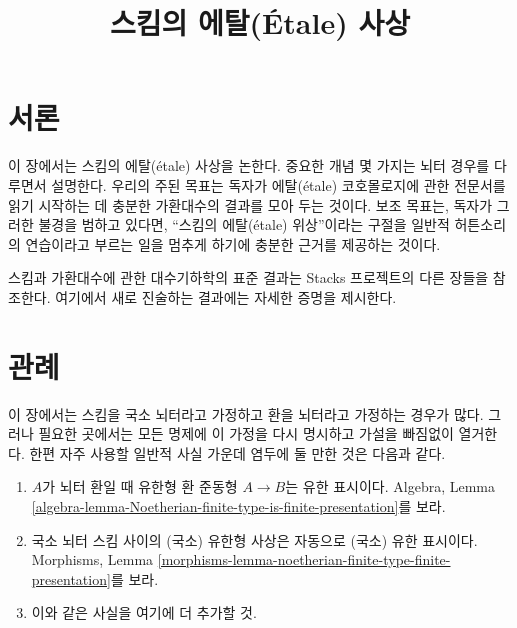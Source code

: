 

%


\title{스킴의 에탈(\'Etale) 사상}

\maketitle

\label{section-phantom}

\tableofcontents



\section{서론}
\label{section-introduction}

\noindent
이 장에서는 스킴의 에탈(\'etale) 사상을 논한다. 중요한 개념 몇 가지는
뇌터 경우를 다루면서 설명한다. 우리의 주된 목표는 독자가 에탈(\'etale)
코호몰로지에 관한 전문서를 읽기 시작하는 데 충분한 가환대수의
결과를 모아 두는 것이다. 보조 목표는, 독자가 그러한 불경을 범하고
있다면, “스킴의 에탈(\'etale) 위상”이라는 구절을 일반적 허튼소리의 연습이라고
부르는 일을 멈추게 하기에 충분한 근거를 제공하는 것이다.

\medskip\noindent
스킴과 가환대수에 관한 대수기하학의 표준 결과는
Stacks 프로젝트의 다른 장들을 참조한다. 여기에서 새로 진술하는
결과에는 자세한 증명을 제시한다.




\section{관례}
\label{section-conventions}

\noindent
이 장에서는 스킴을 국소 뇌터라고 가정하고 환을 뇌터라고
가정하는 경우가 많다. 그러나 필요한 곳에서는 모든 명제에 이
가정을 다시 명시하고 가설을 빠짐없이 열거한다. 한편 자주 사용할
일반적 사실 가운데 염두에 둘 만한 것은 다음과 같다.
\begin{enumerate}
\item $A$가 뇌터 환일 때 유한형 환 준동형 $A \to B$는 유한 표시이다.
Algebra, Lemma
\ref{algebra-lemma-Noetherian-finite-type-is-finite-presentation}를 보라.
\item 국소 뇌터 스킴 사이의 (국소) 유한형 사상은 자동으로
(국소) 유한 표시이다. Morphisms, Lemma
\ref{morphisms-lemma-noetherian-finite-type-finite-presentation}를 보라.
\item 이와 같은 사실을 여기에 더 추가할 것.
\end{enumerate}




